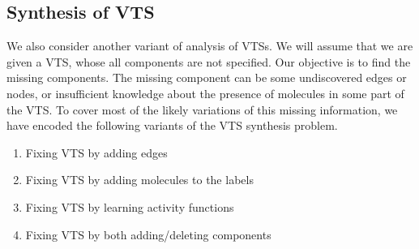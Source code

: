 
%

\subsection{Synthesis of VTS}
%
\noindent We also consider another variant of analysis of VTSs.
%
We will assume that we are given a VTS, whose all components
are not specified.
%
Our objective is to find the missing components.
%
The missing component can
%
be some undiscovered edges or nodes, or insufficient
knowledge about the presence of molecules in some part of the VTS.
%
To cover most of the likely variations of this missing information,
we have encoded the following variants of the VTS synthesis problem.

\begin{enumerate}
	\item Fixing VTS by adding edges 
	\item Fixing VTS by adding molecules to the labels
	\item Fixing VTS by learning activity functions
	\item  Fixing VTS by both adding/deleting components
\end{enumerate}

